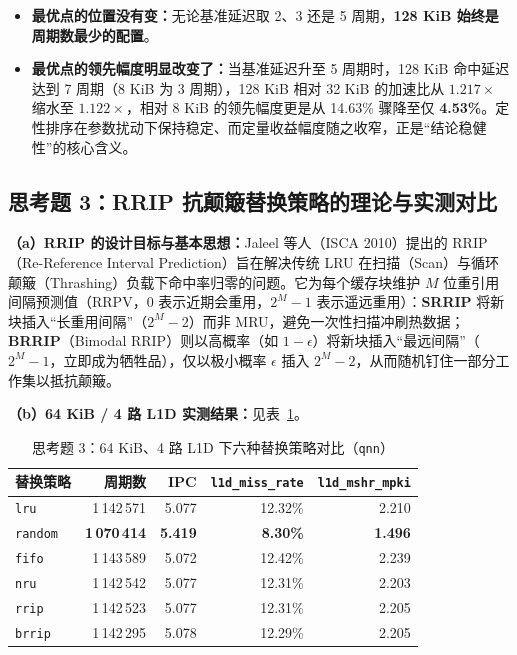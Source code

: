 \documentclass[12pt,a4paper,fontset=mac]{ctexart}
\begin{document}
\begin{itemize}
  \item \textbf{最优点的位置没有变：}无论基准延迟取 2、3 还是 5 周期，\textbf{128 KiB 始终是周期数最少的配置}。
  \item \textbf{最优点的领先幅度明显改变了：}当基准延迟升至 5 周期时，128 KiB 命中延迟达到 7 周期（8 KiB 为 3 周期），128 KiB 相对 32 KiB 的加速比从 $1.217\times$ 缩水至 $1.122\times$，相对 8 KiB 的领先幅度更是从 14.63\% 骤降至仅 \textbf{4.53\%}。定性排序在参数扰动下保持稳定、而定量收益幅度随之收窄，正是“结论稳健性”的核心含义。
\end{itemize}

\subsection{思考题 3：RRIP 抗颠簸替换策略的理论与实测对比}
\textbf{（a）RRIP 的设计目标与基本思想：}Jaleel 等人（ISCA 2010）提出的 RRIP（Re-Reference Interval Prediction）旨在解决传统 LRU 在扫描（Scan）与循环颠簸（Thrashing）负载下命中率归零的问题。它为每个缓存块维护 $M$ 位重引用间隔预测值（RRPV，0 表示近期会重用，$2^M-1$ 表示遥远重用）：\textbf{SRRIP} 将新块插入“长重用间隔”（$2^M-2$）而非 MRU，避免一次性扫描冲刷热数据；\textbf{BRRIP}（Bimodal RRIP）则以高概率（如 $1-\epsilon$）将新块插入“最远间隔”（$2^M-1$，立即成为牺牲品），仅以极小概率 $\epsilon$ 插入 $2^M-2$，从而随机钉住一部分工作集以抵抗颠簸。

\textbf{（b）64 KiB / 4 路 L1D 实测结果：}见表~\ref{tab:q3}。

\begin{table}[H]\centering\small
\caption{思考题 3：64 KiB、4 路 L1D 下六种替换策略对比（\texttt{qnn}）}\label{tab:q3}
\begin{tabular}{lrrrr}\toprule
替换策略 & 周期数 & IPC & \texttt{l1d\_miss\_rate} & \texttt{l1d\_mshr\_mpki} \\\midrule
\texttt{lru}    & 1\,142\,571 & 5.077 & 12.32\% & 2.210 \\
\texttt{random} & \textbf{1\,070\,414} & \textbf{5.419} & \textbf{8.30\%}  & \textbf{1.496} \\
\texttt{fifo}   & 1\,143\,589 & 5.072 & 12.42\% & 2.239 \\
\texttt{nru}    & 1\,142\,542 & 5.077 & 12.31\% & 2.203 \\
\texttt{rrip}   & 1\,142\,523 & 5.077 & 12.31\% & 2.205 \\
\texttt{brrip}  & 1\,142\,295 & 5.078 & 12.29\% & 2.205 \\
\bottomrule\end{tabular}
\end{table}
\end{document}

